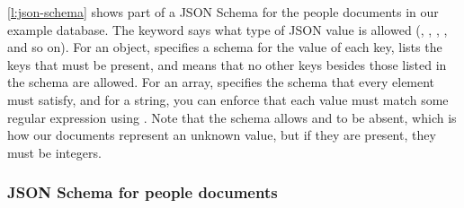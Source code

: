 \autoref{l:json-schema} shows part of a JSON Schema for the people documents in our example database.
The  keyword says what type of JSON value is allowed (, , , , and so on).
For an object,  specifies a schema for the value of each key,  lists the keys that must be present, and  means that no other keys besides those listed in the schema are allowed.
For an array,  specifies the schema that every element must satisfy, and for a string, you can enforce that each value must match some regular expression using .
Note that the schema allows  and  to be absent, which is how our documents represent an unknown value, but if they are present, they must be integers.

\begin{frame}
    \label{s:json-schema}
    \frametitle{JSON Schema for people documents}
    \inputminted[fontsize=\scriptsize]{json}{code/person-schema.json}
\end{frame}
\label{l:json-schema}

